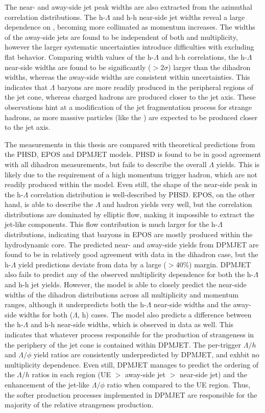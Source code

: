 The near- and away-side jet peak widths are also extracted from the azimuthal correlation distributions. The h-$\Lambda$ and h-h near-side jet widths reveal a large dependence on \pt, becoming more collimated as momentum increases. The widths of the away-side jets are found to be independent of both \pt and multiplicity, however the larger systematic uncertainties introduce difficulties with excluding flat behavior. Comparing width values of the h-$\Lambda$ and h-h correlations, the h-$\Lambda$ near-side widths are found to be significantly ($> 2\sigma$) larger than the dihadron widths, whereas the away-side widths are consistent within uncertainties. This indicates that $\Lambda$ baryons are more readily produced in the peripheral regions of the jet cone, whereas charged hadrons are produced closer to the jet axis. These observations hint at a modification of the jet fragmentation process for strange hadrons, as more massive particles (like the \lmb) are expected to be produced closer to the jet axis.

The measurements in this thesis are compared with theoretical predictions from the PHSD, EPOS and DPMJET models. PHSD is found to be in good agreement with all dihadron measurements, but fails to describe the overall $\Lambda$ yields. This is likely due to the requirement of a high momentum trigger hadron, which are not readily produced within the model. Even still, the shape of the near-side peak in the h-$\Lambda$ correlation distribution is well-described by PHSD. EPOS, on the other hand, is able to describe the $\Lambda$ and hadron yields very well, but the correlation distributions are dominated by elliptic flow, making it impossible to extract the jet-like components. This flow contribution is much larger for the h-$\Lambda$ distributions, indicating that \lmb baryons in EPOS are mostly produced within the hydrodynamic core. The predicted near- and away-side yields from DPMJET are found to be in relatively good agreement with data in the dihadron case, but the h-$\Lambda$ yield predictions deviate from data by a large ($>40$\%) margin. DPMJET also fails to predict any of the observed multiplicity dependence for both the h-$\Lambda$ and h-h jet yields. However, the model is able to closely predict the near-side widths of the dihadron distributions across all multiplicity and momentum ranges, although it underpredicts both the h-$\Lambda$ near-side widths and the away-side widths for both ($\Lambda$, h) cases. The model also predicts a difference between the h-$\Lambda$ and h-h near-side widths, which is observed in data as well. This indicates that whatever process responsible for the production of strangeness in the periphery of the jet cone is contained within DPMJET. The per-trigger $\Lambda/h$ and $\Lambda/\phi$ yield ratios  are consistently underpredicted by DPMJET, and exhbit no multiplicity dependence. Even still, DPMJET manages to predict the ordering of the $\Lambda/h$ ratios in each region (UE $>$ away-side jet $>$ near-side jet) and the enhancement of the jet-like $\Lambda/\phi$ ratio when compared to the UE region. Thus, the softer production processes implemented in DPMJET are responsible for the majority of the relative strangeness production. 


